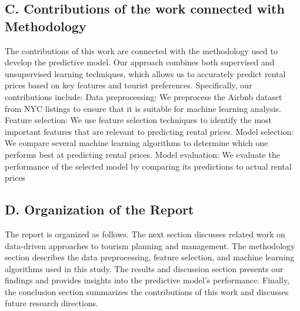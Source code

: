 \documentclass[conference]{IEEEtran}
\begin{document}
\subsection*{\centering C. Contributions of the work connected with Methodology}
The contributions of this work are connected with the methodology used to develop the predictive model. Our approach combines both supervised and unsupervised learning techniques, which allows us to accurately predict rental prices based on key features and tourist preferences. Specifically, our contributions include:
Data preprocessing: We preprocess the Airbnb dataset from NYC listings to ensure that it is suitable for machine learning analysis.
Feature selection: We use feature selection techniques to identify the most important features that are relevant to predicting rental prices.
Model selection: We compare several machine learning algorithms to determine which one performs best at predicting rental prices.
Model evaluation: We evaluate the performance of the selected model by comparing its predictions to actual rental prices



\subsection*{\centering D. Organization of the Report}
The report is organized as follows. The next section discusses related work on data-driven approaches to tourism planning and management. The methodology section describes the data preprocessing, feature selection, and machine learning algorithms used in this study. The results and discussion section presents our findings and provides insights into the predictive model's performance. Finally, the conclusion section summarizes the contributions of this work and discusses future research directions.
\end{document}
